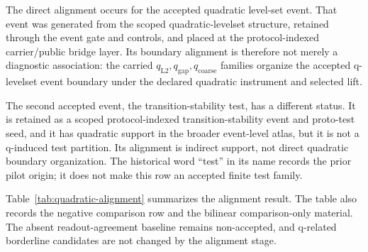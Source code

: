 \documentclass[11pt]{article}
\theoremstyle{definition}
\begin{document}
The direct alignment occurs for the accepted quadratic level-set event. That event was generated from the scoped quadratic-levelset structure, retained through the event gate and controls, and placed at the protocol-indexed carrier/public bridge layer. Its boundary alignment is therefore not merely a diagnostic association: the carried $q_{\mathrm{L2}}, q_{\mathrm{gap}}, q_{\mathrm{coarse}}$ families organize the accepted q-levelset event boundary under the declared quadratic instrument and selected lift.

The second accepted event, the transition-stability test, has a different status. It is retained as a scoped protocol-indexed transition-stability event and proto-test seed, and it has quadratic support in the broader event-level atlas, but it is not a q-induced test partition. Its alignment is indirect support, not direct quadratic boundary organization. The historical word ``test'' in its name records the prior pilot origin; it does not make this row an accepted finite test family.

Table~\ref{tab:quadratic-alignment} summarizes the alignment result. The table also records the negative comparison row and the bilinear comparison-only material. The absent readout-agreement baseline remains non-accepted, and q-related borderline candidates are not changed by the alignment stage.
\end{document}
